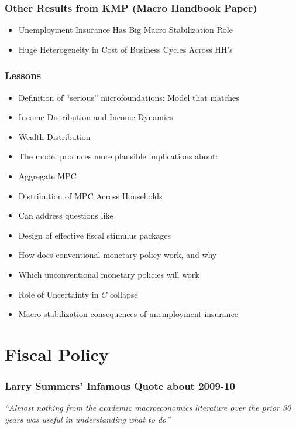 \documentclass{beamer}
\newcommand{\jemph}[1]{{\color{jirkasred}#1}}
\begin{document}
\begin{frame}\frametitle{Other Results from KMP (Macro Handbook Paper)}

\begin{itemize}
\item Unemployment Insurance Has Big Macro Stabilization Role
\item Huge Heterogeneity in Cost of Business Cycles Across HH's
\end{itemize}

\end{frame}

\begin{frame}
\frametitle{Lessons}
\begin{itemize}
  \item Definition of ``serious'' microfoundations: Model that matches
\bi
\item Income Distribution and Income Dynamics
\item Wealth Distribution
\ei
  \item The model produces more plausible implications about:
  \bi
  \item \jemph{Aggregate MPC}
  \item \jemph{Distribution of MPC Across Households}
  \ei
  \item Can address questions like
\bi
\item Design of effective fiscal stimulus packages
\item How does conventional monetary policy work, and why
\item Which unconventional monetary policies will work
\item Role of Uncertainty in $C$ collapse
\item Macro stabilization consequences of unemployment insurance
\ei
\end{itemize}
\end{frame}

\section{Fiscal Policy}

\begin{frame}\frametitle{Larry Summers' Infamous Quote about 2009-10}

{\it ``Almost nothing from the academic macroeconomics literature over the prior
30 years was useful in understanding what to do''} 


\begin{center}
\end{center}

\end{frame}
\end{document}
